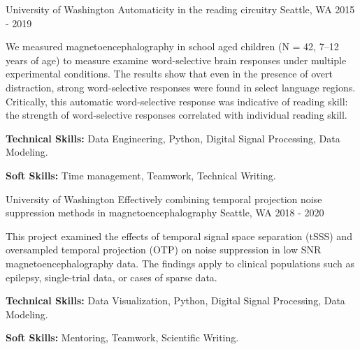

\begin{cventries}
  \cventry
    {University of Washington} %
    {Automaticity in the reading circuitry} %
    {Seattle, WA} %
    {2015 - 2019} %
    {
      \begin{cvitems} %
        \item {We measured magnetoencephalography in school aged children (N = 42, 7–12 years of age) to measure examine word-selective brain responses under multiple experimental conditions. The results show that even in the presence of overt distraction, strong word-selective responses were found in select language regions. Critically, this automatic word-selective response was indicative of reading skill: the strength of word-selective responses correlated with individual reading skill.}
        \item {\textbf{Technical Skills:} Data Engineering, Python, Digital Signal Processing, Data Modeling.}
        \item {\textbf{Soft Skills:} Time management, Teamwork, Technical Writing.}
      \end{cvitems}
    }

  \cventry
    {University of Washington} %
    {Effectively combining temporal projection noise suppression methods in magnetoencephalography} %
    {Seattle, WA} %
    {2018 - 2020} %
    {
      \begin{cvitems} %
        \item {This project examined the effects of temporal signal space separation (tSSS) and oversampled temporal projection (OTP) on noise suppression in low SNR magnetoencephalography data. The findings apply to clinical populations such as epilepsy, single-trial data, or cases of sparse data.}
        \item {\textbf{Technical Skills:} Data Visualization, Python, Digital Signal Processing, Data Modeling.}
        \item {\textbf{Soft Skills:} Mentoring, Teamwork, Scientific Writing.}
      \end{cvitems}
    }


\end{cventries}
